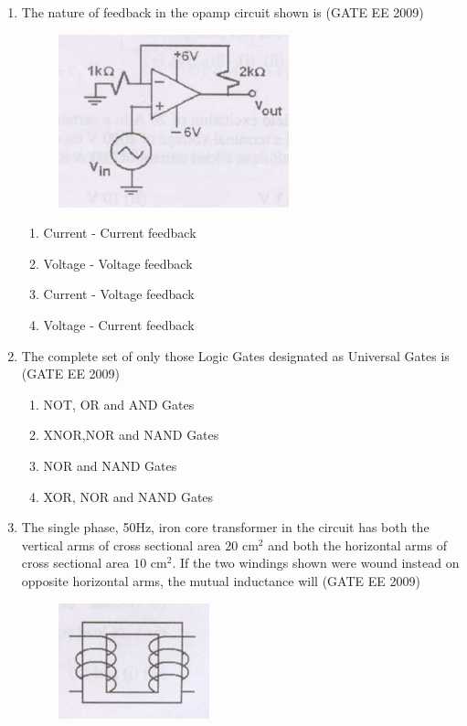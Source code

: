 \documentclass[journal,12pt,onecolumn]{IEEEtran}
\theoremstyle{remark}
\begin{document}
\begin{flushleft}
\begin{enumerate}
\item The nature of feedback in the opamp circuit shown is
\hfill(GATE EE 2009)
\begin{figure}[h]

    \centering
    \includegraphics[width=0.5\columnwidth]{figs/Screenshot 2025-08-08 182804.png}
    \caption{}
    \label{fig:placeholder}
\end{figure}

\begin{enumerate}
    \item Current - Current feedback
    \item Voltage - Voltage feedback
    \item Current - Voltage feedback
    \item Voltage - Current feedback
\end{enumerate}



\item The complete set of only those Logic Gates designated as Universal Gates is
\hfill(GATE EE 2009)
\begin{enumerate}
     \item NOT, OR and AND Gates
     \item XNOR,NOR and NAND Gates
     \item NOR and NAND Gates
     \item XOR,  NOR and NAND Gates
\end{enumerate}


\item The single phase, 50Hz, iron core transformer in the circuit has both the vertical arms of cross sectional area $20\text{ cm}^2$ and both the horizontal arms of cross sectional area $10\text{ cm}^2$. If the two windings shown were wound instead on opposite horizontal arms, the mutual inductance will
\hfill(GATE EE 2009)
\begin{figure}[h]
    \centering
    \includegraphics[width=0.5\columnwidth]{figs/Screenshot 2025-08-08 191933.png}
    \caption{}
    \label{fig:placeholder}
\end{figure}


\end{enumerate}
\end{flushleft}
\end{document}
